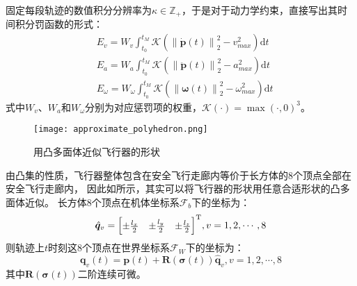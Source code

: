固定每段轨迹的数值积分分辨率为$\kappa \in \mathbb{Z}_+$，于是对于动力学约束，直接写出其时间积分罚函数的形式：
\begin{align}
  &E_v = W_v \int_{t_0}^{t_M} \mathcal{K}(\left\|\dot{\bm{p}}(t)\right\|_2^2 - v_{max}^2)\mathrm{d}t 
  \label{equ:velocity_penalty} \\
  &E_a = W_a \int_{t_0}^{t_M} \mathcal{K}(\left\|\ddot{\bm{p}}(t)\right\|_2^2 - a_{max}^2)\mathrm{d}t 
  \label{equ:acceleration_penalty} \\
  &E_{\omega} = W_{\omega} \int_{t_0}^{t_M} \mathcal{K}(\left\|\bm{\omega}(t)\right\|_2^2 - {\omega}_{max}^2)\mathrm{d}t 
  \label{equ:angular_velocity_penalty}
\end{align}
式中$W_v$、$W_a$和$W_{\omega}$分别为对应惩罚项的权重，$\mathcal{K}(\cdot)=\max(\cdot, 0)^3$。

\begin{figure}[ht]
  \centering
  \texttt{[image: approximate\_polyhedron.png]}
  \caption{用凸多面体近似飞行器的形状}
  \label{fig:using_polyhedron_to_approximate_geometry_of_drone}
\end{figure}

由凸集的性质，飞行器整体包含在安全飞行走廊内等价于长方体的8个顶点全部在安全飞行走廊内，
因此如所示，其实可以将飞行器的形状用任意合适形状的凸多面体近似\cite{han2021fast}。
长方体8个顶点在机体坐标系$\mathscr{F}_b$下的坐标为：
\begin{equation}
  \hat{\bm{q}}_v = {
    \begin{bmatrix}
      \pm\frac{l_x}{2} & \pm\frac{l_y}{2} & \pm\frac{l_z}{2} 
    \end{bmatrix}
  }^{\text{T}}, v = 1, 2, \cdots, 8
  \label{equ:vertices_of_cuboid_in_body_frame}
\end{equation}
则轨迹上$t$时刻这8个顶点在世界坐标系$\mathscr{F}_W$下的坐标为：
\begin{equation}
  \bm{q}_v(t) = \bm{p}(t) + \bm{R}(\bm{\sigma}(t))\hat{\bm{q}}_v ,
  v = 1, 2, \cdots, 8
  \label{equ:vertices_of_cuboid_in_world_frame}
\end{equation}
其中$\bm{R}(\bm{\sigma}(t))$二阶连续可微。

